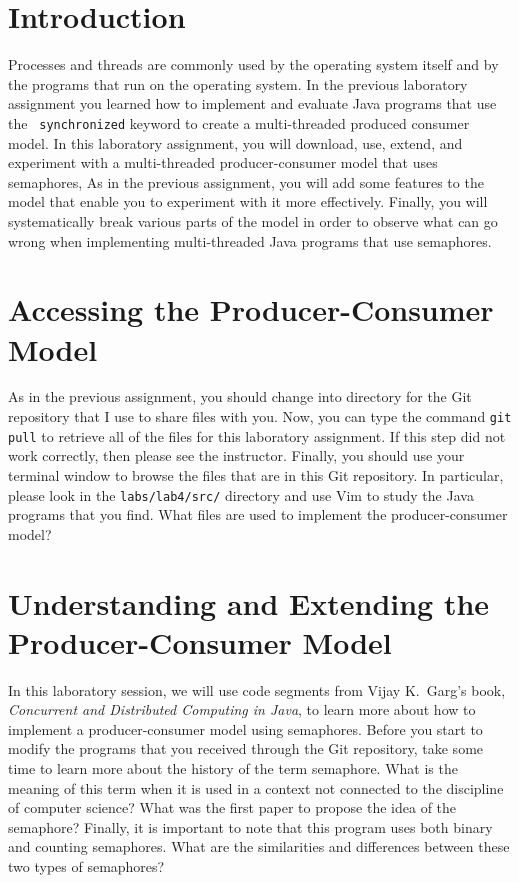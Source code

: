 


\usepackage[compact]{titlesec}


\section*{Introduction}

Processes and threads are commonly used by the operating system itself and by the programs that run on the operating
system. In the previous laboratory assignment you learned how to implement and evaluate Java programs that use the {\tt
  synchronized} keyword to create a multi-threaded produced consumer model. In this laboratory assignment, you will
download, use, extend, and experiment with a multi-threaded producer-consumer model that uses semaphores,  As in the
previous assignment, you will add some features to the model that enable you to experiment with it more effectively.
Finally, you will systematically break various parts of the model in order to observe what can go wrong when
implementing multi-threaded Java programs that use semaphores.

\section*{Accessing the Producer-Consumer Model}

As in the previous assignment, you should change into directory for the Git repository that I use to share files with
you. Now, you can type the command {\tt git pull} to retrieve all of the files for this laboratory assignment. If this
step did not work correctly, then please see the instructor.  Finally, you should use your terminal window to browse
the files that are in this Git repository.  In particular, please look in the {\tt labs/lab4/src/} directory and use Vim
to study the Java programs that you find. What files are used to implement the producer-consumer model?

\section*{Understanding and Extending the Producer-Consumer Model}

In this laboratory session, we will use code segments from Vijay K.\ Garg's book, {\em Concurrent and Distributed
  Computing in Java}, to learn more about how to implement a producer-consumer model using semaphores.  Before you start
to modify the programs that you received through the Git repository, take some time to learn more about the history of
the term semaphore.  What is the meaning of this term when it is used in a context not connected to the discipline of
computer science? What was the first paper to propose the idea of the semaphore? Finally, it is important to note that
this program uses both binary and counting semaphores. What are the similarities and differences between these two types
of semaphores?

